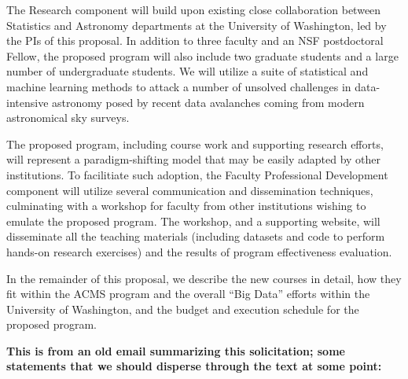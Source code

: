 The Research component will build upon existing close collaboration between Statistics and Astronomy departments at the 
University of Washington, led by the PIs of this proposal. In addition to three faculty and an NSF postdoctoral Fellow, 
the proposed program will also include two graduate students and a large number of undergraduate students. We will 
utilize a suite of statistical and machine learning methods to attack a number of unsolved challenges in data-intensive 
astronomy posed by recent data avalanches coming from modern astronomical sky surveys. 

The proposed program, including course work and supporting research efforts, will represent a paradigm-shifting model  
that may be easily adapted by other institutions. To facilitiate such adoption, the Faculty Professional Development component 
will utilize several communication and dissemination techniques, culminating with a workshop for faculty from other 
institutions wishing to emulate the proposed program. The workshop, and a supporting website, will disseminate all the 
teaching materials (including datasets and code to perform hands-on research exercises) and the results of program 
effectiveness evaluation. 

In the remainder of this proposal, we describe the new courses in detail, how they fit within the ACMS program and the  
overall ``Big Data'' efforts within the University of Washington, and the budget and execution schedule for the proposed 
program.  



{\bf This is from an old email summarizing this solicitation; some
statements that we should disperse through the text at some point:} 

